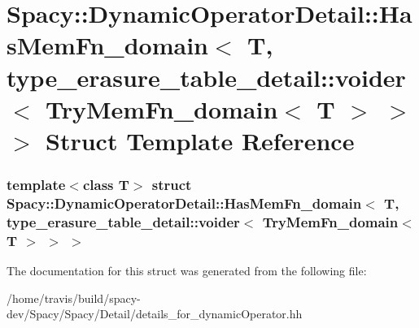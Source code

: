 \hypertarget{structSpacy_1_1DynamicOperatorDetail_1_1HasMemFn__domain_3_01T_00_01type__erasure__table__detail9ab01d126bfabfc28f63bddacb175c8f}{\section{\-Spacy\-:\-:\-Dynamic\-Operator\-Detail\-:\-:\-Has\-Mem\-Fn\-\_\-domain$<$ \-T, type\-\_\-erasure\-\_\-table\-\_\-detail\-:\-:voider$<$ \-Try\-Mem\-Fn\-\_\-domain$<$ \-T $>$ $>$ $>$ \-Struct \-Template \-Reference}
\label{structSpacy_1_1DynamicOperatorDetail_1_1HasMemFn__domain_3_01T_00_01type__erasure__table__detail9ab01d126bfabfc28f63bddacb175c8f}
}
\subsubsection*{template$<$class T$>$ struct Spacy\-::\-Dynamic\-Operator\-Detail\-::\-Has\-Mem\-Fn\-\_\-domain$<$ T, type\-\_\-erasure\-\_\-table\-\_\-detail\-::voider$<$ Try\-Mem\-Fn\-\_\-domain$<$ T $>$ $>$ $>$}



\-The documentation for this struct was generated from the following file\-:\begin{DoxyCompactItemize}
\item 
/home/travis/build/spacy-\/dev/\-Spacy/\-Spacy/\-Detail/details\-\_\-for\-\_\-dynamic\-Operator.\-hh\end{DoxyCompactItemize}
